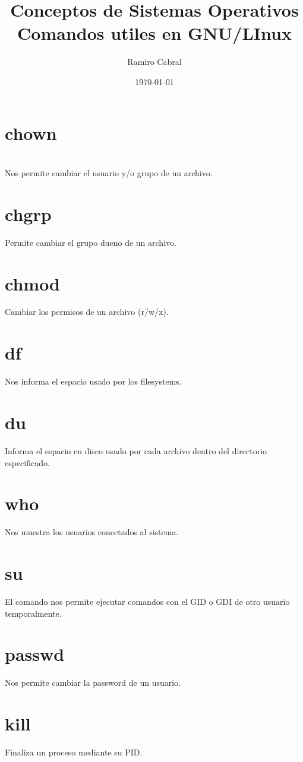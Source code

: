 \documentclass[11pt]{article}
\title{\Huge{Conceptos de Sistemas Operativos\\
Comandos utiles en GNU/LInux}}
\author{\huge{Ramiro Cabral}}
\date{\today}
\begin{document}
\maketitle
\pagebreak

\section*{chown}

\textbf{}\\

Nos permite cambiar el usuario y/o grupo de un archivo.

\section*{chgrp}
Permite cambiar el grupo dueno de un archivo.

\section*{chmod}
Cambiar los permisos de un archivo (r/w/x).

\section*{df}
Nos informa el espacio usado por los filesystems.

\section*{du}
Informa el espacio en disco usado por cada archivo dentro del directorio especificado.

\section*{who}
Nos muestra los usuarios conectados al sistema.

\section*{su}
El comando nos permite ejecutar comandos con el GID o GDI de otro usuario temporalmente.

\section*{passwd}
Nos permite cambiar la password de un usuario.

\section*{kill}
Finaliza un proceso mediante su PID.
\end{document}
